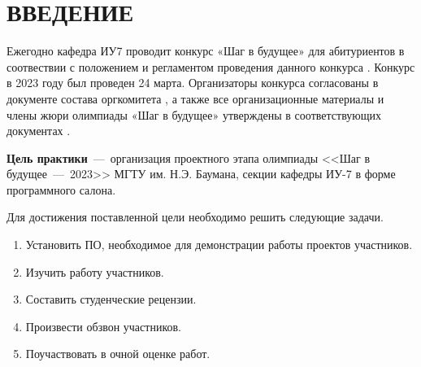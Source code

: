 \chapter*{ВВЕДЕНИЕ}

Ежегодно кафедра ИУ7 проводит конкурс «Шаг в будущее» для абитуриентов в соотвествии с положением и регламентом проведения данного конкурса \cite{bib1, bib2}. Конкурс в 2023 году был проведен 24 марта. Организаторы конкурса согласованы в документе состава оргкомитета \cite{bib3}, а также все организационные материалы и члены жюри олимпиады «Шаг в будущее» утверждены в соответствующих документах \cite{bib4, bib5}.

\textbf{Цель практики}~---~организация проектного этапа олимпиады <<Шаг в будущее~---~2023>> МГТУ им. Н.Э. Баумана, секции кафедры ИУ-7 в форме программного салона.

Для достижения поставленной цели необходимо решить следующие задачи.

\begin{enumerate}
	\item Установить ПО, необходимое для демонстрации работы проектов участников.
	\item Изучить работу участников.
	\item Составить студенческие рецензии.
	\item Произвести обзвон участников.
	\item Поучаствовать в очной оценке работ.
\end{enumerate}
